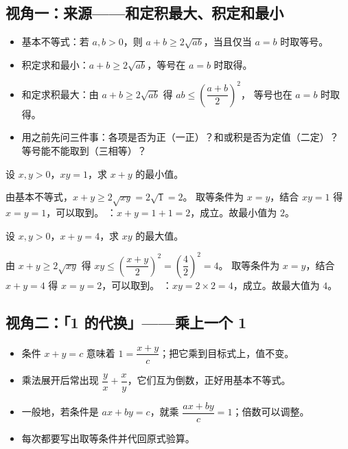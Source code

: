 \begin{explore}

\subsection{视角一：来源——和定积最大、积定和最小}

\begin{itemize}
  \item 基本不等式：若 $a,b>0$，则 $a+b\geq2\sqrt{ab}$，当且仅当 $a=b$ 时取等号。
  \item 积定求和最小：$a+b\geq2\sqrt{ab}$，等号在 $a=b$ 时取得。
  \item 和定求积最大：由 $a+b\geq2\sqrt{ab}$ 得 $ab\leq\left(\dfrac{a+b}{2}\right)^2$，
        等号也在 $a=b$ 时取得。
  \item 用之前先问三件事：各项是否为正（一正）？和或积是否为定值（二定）？
        等号能不能取到（三相等）？
\end{itemize}

\begin{example}
设 $x,y>0$，$xy=1$，求 $x+y$ 的最小值。
\end{example}
\begin{solution}
由基本不等式，$x+y\geq2\sqrt{xy}=2\sqrt1=2$。
取等条件为 $x=y$，结合 $xy=1$ 得 $x=y=1$，可以取到。
：$x+y=1+1=2$，成立。故最小值为 $2$。
\end{solution}

\begin{problem}
设 $x,y>0$，$x+y=4$，求 $xy$ 的最大值。
\end{problem}
\begin{solution}
由 $x+y\geq2\sqrt{xy}$ 得 $xy\leq\left(\dfrac{x+y}{2}\right)^2=\left(\dfrac42\right)^2=4$。
取等条件为 $x=y$，结合 $x+y=4$ 得 $x=y=2$，可以取到。
：$xy=2\times2=4$，成立。故最大值为 $4$。
\end{solution}

\subsection{视角二：「1 的代换」——乘上一个 1}

\begin{itemize}
  \item 条件 $x+y=c$ 意味着 $1=\dfrac{x+y}{c}$；把它乘到目标式上，值不变。
  \item 乘法展开后常出现 $\dfrac{y}{x}+\dfrac{x}{y}$，它们互为倒数，正好用基本不等式。
  \item 一般地，若条件是 $ax+by=c$，就乘 $\dfrac{ax+by}{c}=1$；倍数可以调整。
  \item 每次都要写出取等条件并代回原式验算。
\end{itemize}


\end{explore}
